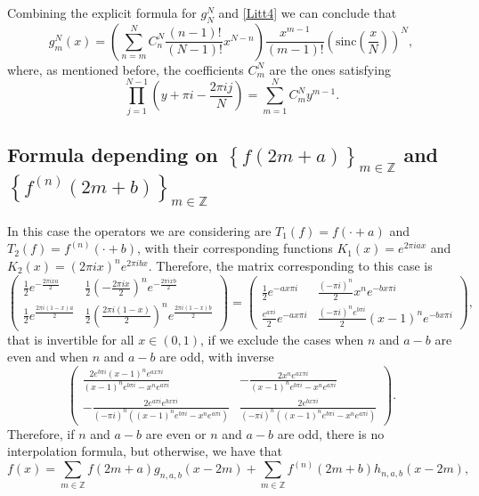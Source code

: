 \documentclass[reqno]{amsart}
\theoremstyle{plain}
\theoremstyle{definition}
\numberwithin{equation}{section}
\newcommand{\Z}{{\mathbb Z}}
\newcommand{\pa}[1]{\left(#1\right)}
\newcommand{\suc}[1]{\left\{#1\right\}}
\newcommand{\sinc}{\mathrm{sinc}}
\begin{document}
Combining the explicit formula for $g^N_N$ and \eqref{Litt4} we can conclude that
$$g^N_m(x)=\pa{\sum_{n=m}^N C_n^N \frac{(n-1)!}{(N-1)!} x^{N-n}} \frac{x^{m-1}}{(m-1)!} \pa{\sinc\pa{\frac{x}{N}}}^N,$$
where, as mentioned before, the coefficients $C^N_m$ are the ones satisfying
$$\prod_{j=1}^{N-1} \pa{y+\pi i-\frac{2\pi i j}{N}}=\sum_{m=1}^N C^N_m y^{m-1}.$$

\subsection{Formula depending on $\suc{f(2m+a)}_{m\in\Z}$ and $\suc{f^{(n)}(2m+b)}_{m\in\Z}$}
In this case the operators we are considering are $T_1(f)=f(\cdot+a)$ and $T_2(f)=f^{(n)}(\cdot+b)$, with their corresponding functions $K_1(x)=e^{2\pi i a x}$ and $K_2(x)=(2\pi i x)^n e^{2\pi i b x}$. Therefore, the matrix corresponding to this case is
$$
\begin{pmatrix}
    \displaystyle \frac{1}{2} e^{-\frac{2\pi i x a}{2}} 
    & \displaystyle \frac{1}{2}\pa{-\frac{2\pi i x}{2}}^n e^{-\frac{2\pi i x b}{2}} \\
    \displaystyle\frac{1}{2} e^\frac{2\pi i (1-x) a}{2} 
    & \displaystyle \frac{1}{2}\pa{\frac{2\pi i (1-x)}{2}}^n e^\frac{2\pi i (1-x) b}{2}
\end{pmatrix}=
\begin{pmatrix}
    \displaystyle \frac{1}{2} e^{-a x \pi i} 
    & \displaystyle \frac{(-\pi i)^n}{2} x^n e^{-b x \pi i} \\
    \displaystyle \frac{e^{a\pi i}}{2} e^{-a x \pi i} 
    & \displaystyle \frac{(-\pi i)^n e^{b\pi i}}{2}(x-1)^n e^{-b x \pi i}
\end{pmatrix},$$
that is invertible for all $x\in (0,1)$, if we exclude the cases when $n$ and $a-b$ are even and when $n$ and $a-b$ are odd, with inverse
$$
\begin{pmatrix}
    \displaystyle \frac{2 e^{b\pi i} (x-1)^n e^{a x \pi i}}{(x-1)^n e^{b \pi i} - x^n e^{a \pi i}} 
    & \displaystyle -\frac{2 x^n e^{a x \pi i}}{(x-1)^n e^{b \pi i} - x^n e^{a \pi i}} \\
    \displaystyle -\frac{2 e^{a\pi i} e^{b x \pi i}}{(-\pi i)^n \pa{(x-1)^n e^{b \pi i} - x^n e^{a \pi i}}} 
    & \displaystyle \frac{2 e^{b x \pi i}}{(-\pi i)^n \pa{(x-1)^n e^{b \pi i} - x^n e^{a \pi i}}}
\end{pmatrix}.$$
Therefore, if $n$ and $a-b$ are even or $n$ and $a-b$ are odd, there is no interpolation formula, but otherwise, we have that
$$f(x)=\sum_{m\in\Z}f(2m+a) g_{n,a,b}(x-2m) +\sum_{m\in\Z}f^{(n)}(2m+b) h_{n,a,b}(x-2m),$$
\end{document}
